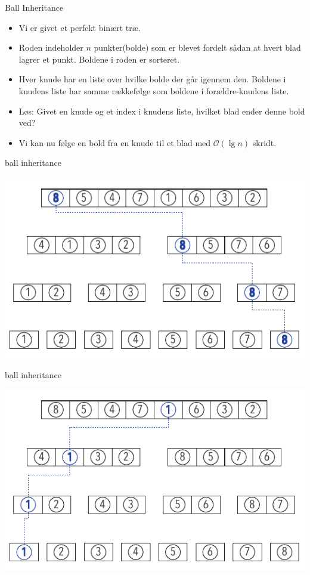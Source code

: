 \documentclass[pdf]{beamer}
\begin{document}
\begin{frame}{Ball Inheritance}

  \begin{itemize}
    \item Vi er givet et perfekt binært træ.
      \pause
    \item Roden indeholder $n$ punkter(bolde) som er blevet fordelt sådan at hvert blad lagrer et punkt. Boldene i roden er sorteret.
      \pause
    \item Hver knude har en liste over hvilke bolde der går igennem den. Boldene i knudens liste har samme rækkefølge som boldene i forældre-knudens liste.
     \pause
    \item Løs: Givet en knude og et index i knudens liste, hvilket blad ender denne bold ved?
     \pause
    \item Vi kan nu følge en bold fra en knude til et blad med $\mathcal{O}(\lg n)$ skridt. 

  \end{itemize}
\end{frame}

\begin{frame}{ball inheritance}
  \begin{center}
    \includegraphics[scale=1.0]{pictures/bolde_8.pdf}
  \end{center}
\end{frame}


\begin{frame}{ball inheritance}
  \begin{center}
    \includegraphics[scale=1.0]{pictures/bolde_1.pdf}
  \end{center}
\end{frame}
\end{document}
